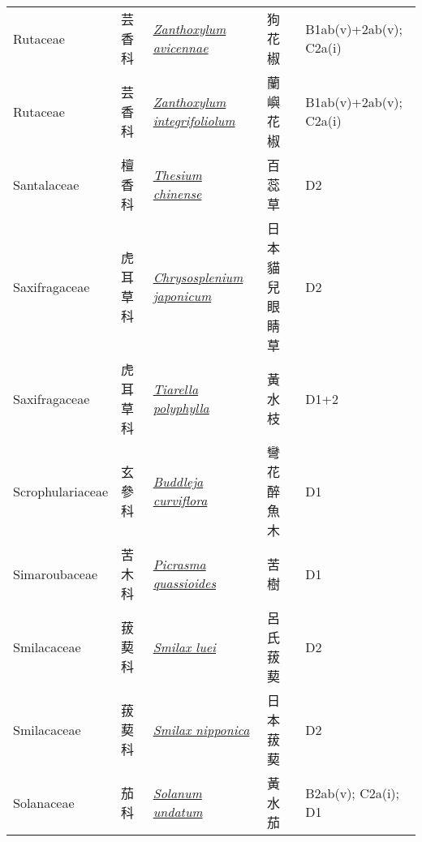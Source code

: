 {\begin{longtable}{p{2.5cm}p{2cm}p{5cm}p{2.5cm}p{3cm}}
    Rutaceae & 芸香科 & \href{http://www.theplantlist.org/tpl1.1/search?q=Zanthoxylum+avicennae}{\textit{Zanthoxylum avicennae} } & 狗花椒 & B1ab(v)+2ab(v); C2a(i) \index{Zanthoxylum@\textit{Zanthoxylum}!avicennae@\textit{avicennae}}  \index{狗花椒} \\
    Rutaceae & 芸香科 & \href{http://www.theplantlist.org/tpl1.1/search?q=Zanthoxylum+integrifoliolum}{\textit{Zanthoxylum integrifoliolum} } & 蘭嶼花椒 & B1ab(v)+2ab(v); C2a(i) \index{Zanthoxylum@\textit{Zanthoxylum}!integrifoliolum@\textit{integrifoliolum}}  \index{蘭嶼花椒} \\
    Santalaceae & 檀香科 & \href{http://www.theplantlist.org/tpl1.1/search?q=Thesium+chinense}{\textit{Thesium chinense} } & 百蕊草 & D2 \index{Thesium@\textit{Thesium}!chinense@\textit{chinense}}  \index{百蕊草} \\
    Saxifragaceae & 虎耳草科 & \href{http://www.theplantlist.org/tpl1.1/search?q=Chrysosplenium+japonicum}{\textit{Chrysosplenium japonicum} } & 日本貓兒眼睛草 & D2 \index{Chrysosplenium@\textit{Chrysosplenium}!japonicum@\textit{japonicum}}  \index{日本貓兒眼睛草} \\
    Saxifragaceae & 虎耳草科 & \href{http://www.theplantlist.org/tpl1.1/search?q=Tiarella+polyphylla}{\textit{Tiarella polyphylla} } & 黃水枝 & D1+2 \index{Tiarella@\textit{Tiarella}!polyphylla@\textit{polyphylla}}  \index{黃水枝} \\
    Scrophulariaceae & 玄參科 & \href{http://www.theplantlist.org/tpl1.1/search?q=Buddleja+curviflora}{\textit{Buddleja curviflora} } & 彎花醉魚木 & D1 \index{Buddleja@\textit{Buddleja}!curviflora@\textit{curviflora}}  \index{彎花醉魚木} \\
    Simaroubaceae & 苦木科 & \href{http://www.theplantlist.org/tpl1.1/search?q=Picrasma+quassioides}{\textit{Picrasma quassioides} } & 苦樹 & D1 \index{Picrasma@\textit{Picrasma}!quassioides@\textit{quassioides}}  \index{苦樹} \\
    Smilacaceae & 菝葜科 & \href{http://www.theplantlist.org/tpl1.1/search?q=Smilax+luei}{\textit{Smilax luei} } & 呂氏菝葜 & D2 \index{Smilax@\textit{Smilax}!luei@\textit{luei}}  \index{呂氏菝葜} \\
    Smilacaceae & 菝葜科 & \href{http://www.theplantlist.org/tpl1.1/search?q=Smilax+nipponica}{\textit{Smilax nipponica} } & 日本菝葜 & D2 \index{Smilax@\textit{Smilax}!nipponica@\textit{nipponica}}  \index{日本菝葜} \\
    Solanaceae & 茄科 & \href{http://www.theplantlist.org/tpl1.1/search?q=Solanum+undatum}{\textit{Solanum undatum} } & 黃水茄 & B2ab(v); C2a(i); D1 \index{Solanum@\textit{Solanum}!undatum@\textit{undatum}}  \index{黃水茄} \\

\end{longtable}}
